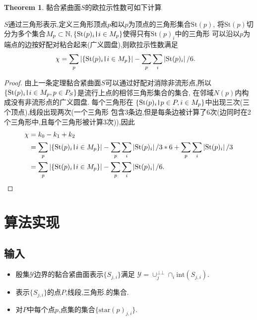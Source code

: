 \documentclass[a4paper]{book}
\numberwithin{equation}{chapter}
\theoremstyle{definition}
\newtheorem{thm}{Theorem}[chapter]
\begin{document}
\begin{thm}
    黏合紧曲面$S$的欧拉示性数可如下计算
    
    $S$通过三角形表示,定义三角形顶点$p$和以$p$为顶点的三角形集合$\text{St}(p)$,
    将$\text{St}(p)$切分为多个集合$ M_p \subset \mathbb{N},
     \{\text{St}(p)_i \verb'|' i \in M_p\}$使得只有$\text{St}(p)_i$中的三角形
    可以沿以$p$为端点的边按好配对粘合起来(广义圆盘),则欧拉示性数满足
    \begin{equation*}
        \begin{aligned}
            \chi 
    &= \sum_p  \left| \{\text{St}(p)_i  \verb'|'  i \in M_p\} \right| - 
    \sum_p \sum_i \left| \text{St}(p)_i \right| / 6.
        \end{aligned}
    \end{equation*}
\end{thm}

\begin{proof}
    由上一条定理黏合紧曲面$S$可以通过好配对消除非流形点,所以
    $\{\text{St}(p)_i \verb'|' i \in M_p, p \in P_S\}$是流行上点的相邻三角形集合的集合,
    在邻域$N(p)$内构成没有非流形点的广义圆盘.
    每个三角形在
    $\{\text{St}(p)_i \verb'|' p \in P, i \in M_p\}$中出现三次(三个顶点),线段出现两次(一个三角形
    包含3条边,但是每条边被计算了6次(边同时在2个三角形中,且每个三角形被计算3次)),因此
    \begin{equation*}
        \begin{aligned}
            \chi &= k_0 - k_1 + k_2 \\
            &= \sum_p \left| \{\text{St}(p)_i \verb'|'  i \in M_p\} \right| - 
\sum_p \sum_i \left| \text{St}(p)_i \right| / 3 * 6 +
 \sum_p \sum_i \left| \text{St}(p)_i \right| / 3 \\
    &= \sum_p  \left| \{\text{St}(p)_i  \verb'|'  i \in M_p\} \right| - 
    \sum_p \sum_i \left| \text{St}(p)_i \right| / 6.
        \end{aligned}
    \end{equation*}
\end{proof}


\section{算法实现}

\subsection{输入}

\begin{itemize}
    \item 殷集$\mathcal{Y}$边界的黏合紧曲面表示$\{S_{j,i}\}$满足
    $\mathcal{Y} = \cup^{\bot\bot}_j \cap_i \text{int}(S_{j,i})$.
    
    \item 表示$\{{S_{j,i}}\}$的点$P$,线段,三角形.的集合.
    \item 对$P$中每个点$p$,点集的集合$\{\text{star}(p)_{j,i}\}$.
\end{itemize}
\end{document}
